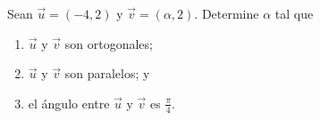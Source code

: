 Sean $\vec u = (-4,2)$ y $\vec v = (\alpha,2)$. Determine $\alpha$ tal que
\begin{enumerate}
  \item $\vec u$ y $\vec v$ son ortogonales;
  \item $\vec u$ y $\vec v$ son paralelos; y
  \item el \'angulo entre $\vec u$ y $\vec v$ es $\frac\pi4$.
\end{enumerate}
